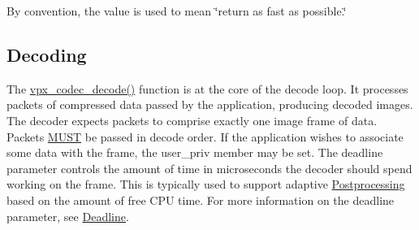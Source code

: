 \-By convention, the value {} is used to mean \char`\"{}return as fast as
    possible.\char`\"{} \hypertarget{usage_decode}{}\subsection{\-Decoding}\label{usage_decode}
\-The \hyperlink{group__decoder_ga3441e157a7a69108bca9a069f2ee8e0d}{vpx\-\_\-codec\-\_\-decode()} function is at the core of the decode loop. \-It processes packets of compressed data passed by the application, producing decoded images. \-The decoder expects packets to comprise exactly one image frame of data. \-Packets \hyperlink{rfc2119_MUST}{\-M\-U\-S\-T} be passed in decode order. \-If the application wishes to associate some data with the frame, the {\ttfamily user\-\_\-priv} member may be set. \-The {\ttfamily deadline} parameter controls the amount of time in microseconds the decoder should spend working on the frame. \-This is typically used to support adaptive \hyperlink{usage_decode_usage_postproc}{\-Postprocessing} based on the amount of free \-C\-P\-U time. \-For more information on the {\ttfamily deadline} parameter, see \hyperlink{usage_usage_deadline}{\-Deadline}.

